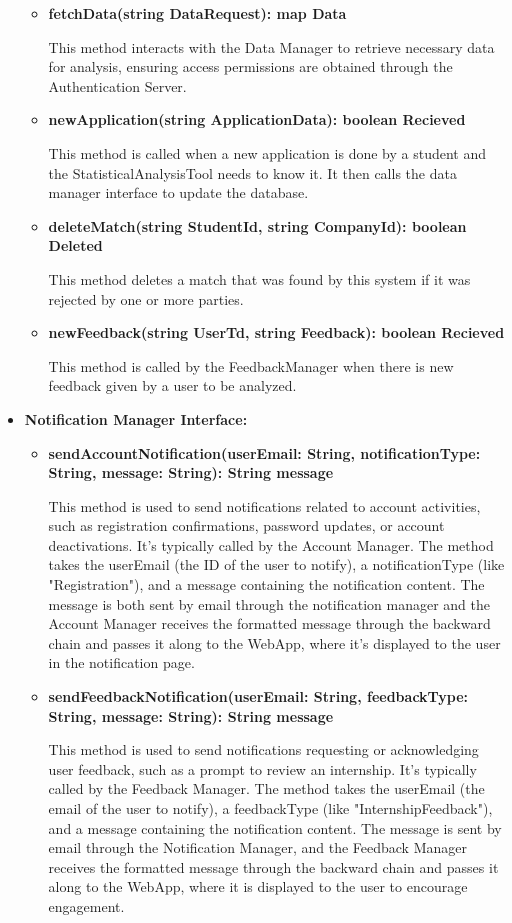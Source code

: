 \begin{itemize}
\begin{itemize}
    \item \textbf{fetchData(string DataRequest): map Data} 

    This method interacts with the Data Manager to retrieve necessary data for analysis, ensuring access permissions are obtained through the Authentication Server.

    \item \textbf{newApplication(string ApplicationData): boolean Recieved}

    This method is called when a new application is done by a student and the StatisticalAnalysisTool needs to know it. It then calls the data manager interface to update the database.

    \item \textbf{deleteMatch(string StudentId, string CompanyId): boolean Deleted}

    This method deletes a match that was found by this system if it was rejected by one or more parties.

    \item \textbf{newFeedback(string UserTd, string Feedback): boolean Recieved}

    This method is called by the FeedbackManager when there is new feedback given by a user to be analyzed. 
    \end{itemize}


\item \textbf{Notification Manager Interface:}
\begin{itemize}
    \item \textbf{sendAccountNotification(userEmail: String, notificationType: String, message: String): String message}

    This method is used to send notifications related to account activities, such as registration confirmations, password updates, or account deactivations. It’s typically called by the Account Manager.
    The method takes the userEmail (the ID of the user to notify), a notificationType (like "Registration"), and a message containing the notification content. The message is both sent by email through the notification manager and the Account Manager receives the formatted message through the backward chain and passes it along to the WebApp, where it’s displayed to the user in the notification page.
    \item \textbf{sendFeedbackNotification(userEmail: String, feedbackType: String, message: String): String message
}

    This method is used to send notifications requesting or acknowledging user feedback, such as a prompt to review an internship. It’s typically called by the Feedback Manager.
    The method takes the userEmail (the email of the user to notify), a feedbackType (like "InternshipFeedback"), and a message containing the notification content. The message is sent by email through the Notification Manager, and the Feedback Manager receives the formatted message through the backward chain and passes it along to the WebApp, where it is displayed to the user to encourage engagement.


\end{itemize}
\end{itemize}
